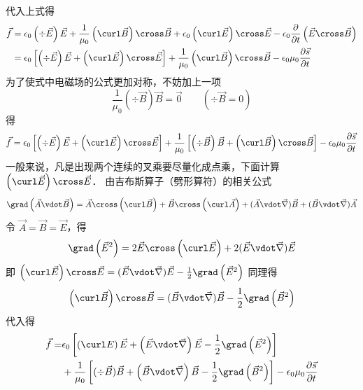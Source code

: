 代入上式得
\begin{equation}
\begin{aligned}
\vec f &= {\epsilon_0}\left( {\div \vec E} \right)\vec E + \frac{1}{{{\mu _0}}}\left( {\curl \vec B} \right) \cross \vec B + {\epsilon_0}\left( {\curl \vec E} \right) \cross \vec E - {\epsilon_0}\frac{\partial }{{\partial t}}\left( {\vec E \cross \vec B} \right)\\
&= {\epsilon_0}\left[ {\left( {\div \vec E} \right)\vec E + \left( {\curl \vec E} \right) \cross \vec E} \right] + \frac{1}{{{\mu _0}}}\left( {\curl \vec B} \right) \cross \vec B - {\epsilon_0}{\mu _0}\frac{{\partial \vec s}}{{\partial t}}
\end{aligned}
\end{equation} 
为了使式中电磁场的公式更加对称，不妨加上一项
\begin{equation}
\frac{1}{{{\mu _0}}}\left( {\div \vec B} \right)\vec B = \vec 0
\qquad
(\div \vec B = 0)
\end{equation} 
得
\begin{equation}
\vec f = {\epsilon_0}\left[ {\left( {\div \vec E} \right)\vec E + \left( {\curl \vec E} \right) \cross \vec E} \right] + \frac{1}{{{\mu _0}}}\left[ {\left( {\div \vec B} \right)\vec B + \left( {\curl \vec B} \right) \cross \vec B} \right] - {\epsilon_0}{\mu _0}\frac{{\partial \vec s}}{{\partial t}}
\end{equation}  
一般来说，凡是出现两个连续的叉乘要尽量化成点乘，下面计算 $\left( {\curl \vec E} \right) \cross \vec E$． 
由吉布斯算子（劈形算符）的相关公式
\begin{equation}
\grad \left( {\vec A \vdot \vec B} \right) = \vec A \cross \left( {\curl \vec B} \right) + \vec B \cross \left( {\curl \vec A} \right) + (\vec A\vdot\vec\nabla )\vec B + (\vec B\vdot\vec\nabla)\vec A
\end{equation} 
令 $\vec A = \vec B = \vec E$，得
\begin{equation}
\grad \left( {{{\vec E}^2}} \right) = 2\vec E \cross \left( {\curl \vec E} \right) + 2(\vec E\vdot\vec\nabla )\vec E
\end{equation} 
即 $\left( {\curl \vec E} \right) \cross \vec E = (\vec E\vdot\vec\nabla)\vec E - \frac{1}{2}\grad \left( {{{\vec E}^2}} \right)$
同理得
\begin{equation}
\left( {\curl \vec B} \right) \cross \vec B = ( \vec B\vdot\vec\nabla )\vec B - \frac{1}{2}\grad \left( {{{\vec B}^2}} \right)
\end{equation} 
代入得
\begin{equation}
\begin{aligned}
\vec f = &{\epsilon_0}\left[ {\left( {\curl E} \right)\vec E + \left( {\vec E\vdot\vec\nabla } \right)\vec E - \frac{1}{2}\grad \left( {{{\vec E}^2}} \right)} \right]\\
&+ \frac{1}{{{\mu _0}}}\left[ {( {\div \vec B} )\vec B + \left( {\vec B\vdot\vec\nabla } \right)\vec B - \frac{1}{2}\grad \left( {{{\vec B}^2}} \right)} \right] - {\epsilon_0}{\mu _0}\frac{{\partial \vec s}}{{\partial t}}
\end{aligned}
\end{equation} 

